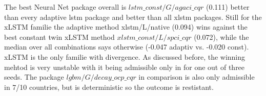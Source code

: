 The best Neural Net package overall is $lstm\_const/G/agaci\_cqr$ (0.111) better than every adaptive lstm package and better than all xlstm packages. Still for the xLSTM familie the adaptive method xlstm/L/native (0.094) wins against the best constant twin xLSTM method $xlstm\_const/L/spci\_cqr$ (0.072), while the median over all combinations says otherwise (-0.047 adaptiv vs. -0.020 const). xLSTM is the only familie with divergence. As discussed before, the winning mehtod is very unstable with it being admissible only in for one out of three seeds. The package $lgbm/G/decay\_ocp\_cqr$ in comparison is also only admissible in 7/10 countries, but is deterministic so the outcome is restistant.\\
